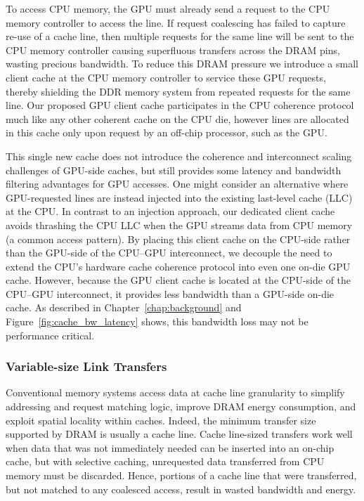 To access CPU memory, the GPU must already send a request to the CPU
memory controller to access the line. If request coalescing has failed to
capture re-use of a cache line, then multiple requests for the same line will
be sent to the CPU memory controller causing superfluous transfers across the DRAM
pins, wasting precious bandwidth.  To reduce this DRAM pressure we introduce a small 
client cache at the CPU memory controller to service
these GPU requests, thereby shielding the DDR memory system from
repeated requests for the same line.  Our proposed GPU client cache participates in the 
CPU coherence protocol much like any other 
coherent cache on the CPU die, however lines are allocated in this cache only upon 
request by an off-chip processor, such as the GPU\@.

This single new cache does not introduce the coherence and interconnect scaling
challenges of GPU-side caches, but still provides some latency and bandwidth
filtering advantages for GPU accesses. One might consider an alternative where
GPU-requested lines are instead injected into the existing last-level cache
(LLC) at the CPU.  In contrast to an injection approach, our dedicated client
cache avoids thrashing the CPU LLC when the GPU streams data from CPU memory (a
common access pattern).  By placing this client cache on the CPU-side rather
than the GPU-side of the CPU--GPU interconnect, we decouple the need to extend
the CPU's hardware cache coherence protocol into even one on-die GPU cache.
However, because the GPU client cache is located at the CPU-side of the CPU--GPU
interconnect, it provides less bandwidth than a GPU-side on-die cache. As
described in Chapter~\ref{chap:background} and Figure~\ref{fig:cache_bw_latency}
shows, this bandwidth loss may not be performance critical.

\subsubsection{Variable-size Link Transfers}
\label{variablesizing}

Conventional memory systems access data at cache line granularity to 
simplify addressing and request matching logic, improve DRAM energy consumption, and 
exploit spatial locality within caches.  Indeed, the minimum transfer size supported
by DRAM is usually a cache line.  Cache line-sized transfers work well when data
that was not immediately needed can be inserted into an on-chip cache, but
with selective caching, unrequested data transferred from CPU memory must be discarded.  
Hence, portions of a cache line that
were transferred, but not matched to any coalesced access, result in wasted
bandwidth and energy. 

